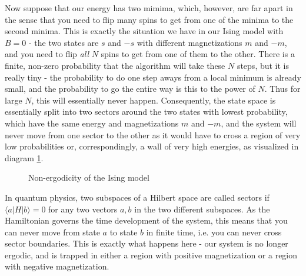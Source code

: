 \documentclass[a4paper, draft]{article}
\theoremstyle{own}
\theoremstyle{remark}
\begin{document}
Now suppose that our energy has two mimima, which, however, are far apart in the sense that you need to flip many spins to get from one of the minima to the second minima. This is exactly the situation we have in our Ising model with $B = 0$ - the two states are $s$ and $-s$ with different magnetizations $m$ and $-m$, and you need to flip {\em all} $N$ spins to get from one of them to the other. There is a finite, non-zero probability that the algorithm will take these $N$ steps, but it is really tiny - the probability to do one step aways from a local minimum is already small, and the probability to go the entire way is this to the power of $N$.  Thus for large $N$, this will essentially never happen. Consequently, the state space is essentially split into two sectors around the two states with lowest probability, which have the same energy and magnetizations $m$ and $-m$, and the system will never move from one sector to the other as it would have to cross a region of very low probabilities or, correspondingly, a wall of very high energies, as visualized in diagram \ref{fig:Sectors}.


\begin{figure}[ht]
	\begin{center}
	\end{center}
	\caption{Non-ergodicity of the Ising model}
	\label{fig:Sectors}
\end{figure}


In quantum physics, two subspaces of a Hilbert space are called sectors if $\langle a | H | b \rangle = 0$ for any two vectors $a, b$ in the two different subspaces. As the Hamiltonian governs the time development of the system, this means that you can never move from state $a$ to state $b$ in finite time, i.e. you can never cross sector boundaries. This is exactly what happens here - our system is no longer ergodic, and is trapped in either a region with positive magnetization or a region with negative magnetization.
\end{document}
